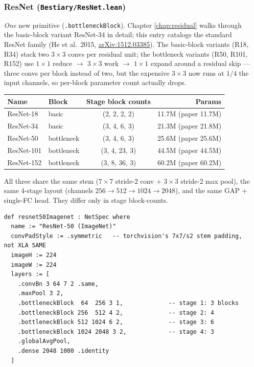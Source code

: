 \subsubsection*{ResNet (\texttt{Bestiary/ResNet.lean})}
\emph{One} new primitive (\texttt{.bottleneckBlock}). Chapter
\ref{chap:residual} walks through the basic-block variant
ResNet-34 in detail; this entry catalogs the standard ResNet
family (He et al.\ 2015,
\href{https://arxiv.org/abs/1512.03385}{arXiv:1512.03385}). The
basic-block variants (R18, R34) stack two $3\times 3$ convs per
residual unit; the bottleneck variants (R50, R101, R152) use
$1\times 1$ reduce $\to$ $3\times 3$ work $\to$ $1\times 1$ expand
around a residual skip --- three convs per block instead of two,
but the expensive $3\times 3$ now runs at $1/4$ the input channels,
so per-block parameter count actually drops.

\begin{center}
\begin{tabular}{l l c r}
\hline
Name & Block & Stage block counts & Params \\
\hline
ResNet-18  & basic      & (2, 2, 2, 2)  & 11.7M (paper 11.7M) \\
ResNet-34  & basic      & (3, 4, 6, 3)  & 21.3M (paper 21.8M) \\
ResNet-50  & bottleneck & (3, 4, 6, 3)  & 25.6M (paper 25.6M) \\
ResNet-101 & bottleneck & (3, 4, 23, 3) & 44.5M (paper 44.5M) \\
ResNet-152 & bottleneck & (3, 8, 36, 3) & 60.2M (paper 60.2M) \\
\hline
\end{tabular}
\end{center}

All three share the same stem ($7\times 7$ stride-2 conv +
$3\times 3$ stride-2 max pool), the same 4-stage layout (channels
$256 \to 512 \to 1024 \to 2048$), and the same GAP + single-FC
head. They differ only in stage block-counts.

\begin{verbatim}
def resnet50Imagenet : NetSpec where
  name := "ResNet-50 (ImageNet)"
  convPadStyle := .symmetric   -- torchvision's 7x7/s2 stem padding, not XLA SAME
  imageH := 224
  imageW := 224
  layers := [
    .convBn 3 64 7 2 .same,
    .maxPool 3 2,
    .bottleneckBlock  64  256 3 1,             -- stage 1: 3 blocks
    .bottleneckBlock 256  512 4 2,             -- stage 2: 4
    .bottleneckBlock 512 1024 6 2,             -- stage 3: 6
    .bottleneckBlock 1024 2048 3 2,            -- stage 4: 3
    .globalAvgPool,
    .dense 2048 1000 .identity
  ]
\end{verbatim}

